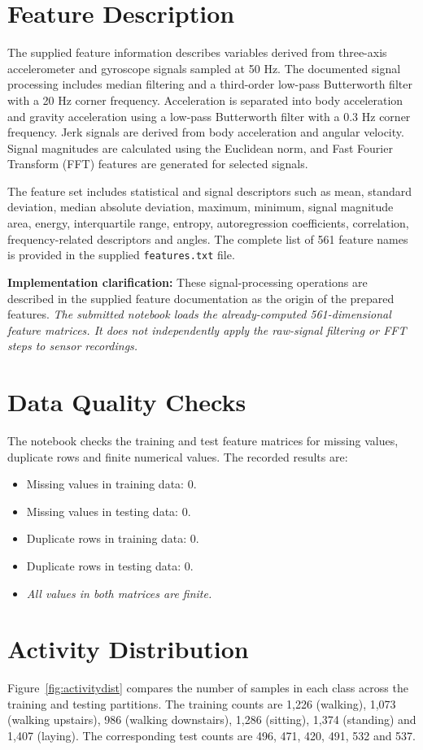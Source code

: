 \section{Feature Description}
The supplied feature information describes variables derived from three-axis accelerometer and gyroscope signals sampled at 50 Hz. The documented signal processing includes median filtering and a third-order low-pass Butterworth filter with a 20 Hz corner frequency. Acceleration is separated into body acceleration and gravity acceleration using a low-pass Butterworth filter with a 0.3 Hz corner frequency. Jerk signals are derived from body acceleration and angular velocity. Signal magnitudes are calculated using the Euclidean norm, and Fast Fourier Transform (FFT) features are generated for selected signals.

The feature set includes statistical and signal descriptors such as mean, standard deviation, median absolute deviation, maximum, minimum, signal magnitude area, energy, interquartile range, entropy, autoregression coefficients, correlation, frequency-related descriptors and angles. The complete list of 561 feature names is provided in the supplied \texttt{features.txt} file.

\textbf{Implementation clarification:} These signal-processing operations are described in the supplied feature documentation as the origin of the prepared features. \emph{The submitted notebook loads the already-computed 561-dimensional feature matrices. It does not independently apply the raw-signal filtering or FFT steps to sensor recordings.}

\section{Data Quality Checks}
The notebook checks the training and test feature matrices for missing values, duplicate rows and finite numerical values. The recorded results are:
\begin{itemize}
\item Missing values in training data: 0.
\item Missing values in testing data: 0.
\item Duplicate rows in training data: 0.
\item Duplicate rows in testing data: 0.
\item \emph{All values in both matrices are finite.}
\end{itemize}

\section{Activity Distribution}
Figure~\ref{fig:activitydist} compares the number of samples in each class across the training and testing partitions. The training counts are 1,226 (walking), 1,073 (walking upstairs), 986 (walking downstairs), 1,286 (sitting), 1,374 (standing) and 1,407 (laying). The corresponding test counts are 496, 471, 420, 491, 532 and 537.

